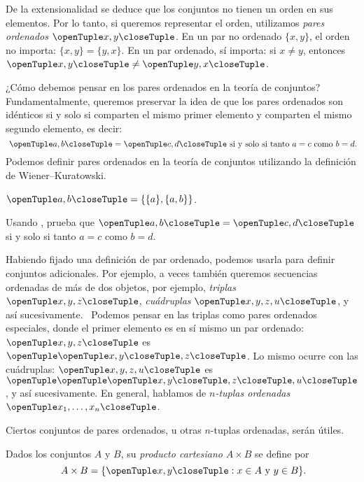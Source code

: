 \documentclass[../../../include/open-logic-section]{subfiles}
\begin{document}

\begin{explain}
De la extensionalidad se deduce que los conjuntos no tienen un orden en sus elementos. Por lo tanto, si queremos representar el orden, utilizamos \emph{pares ordenados} $\tuple{x, y}$. En un par no ordenado $\{x, y\}$, el orden no importa: $\{x, y\} = \{y, x\}$. En un par ordenado, sí importa: si $x \neq y$, entonces $\tuple{x, y} \neq \tuple{y, x}$.

¿Cómo debemos pensar en los pares ordenados en la teoría de conjuntos? Fundamentalmente, queremos preservar la idea de que los pares ordenados son idénticos si y solo si comparten el mismo primer elemento y comparten el mismo segundo elemento, es decir:
\[
  \tuple{a, b}= \tuple{c, d}\text{ si y solo si tanto }a = c \text{ como }b=d.
\]
Podemos definir pares ordenados en la teoría de conjuntos utilizando la definición de Wiener--Kuratowski.
\end{explain}

\begin{defn}
	$\tuple{a, b} = \{\{a\}, \{a, b\}\}$.
\end{defn}

\begin{prob}
	Usando , prueba que $\tuple{a, b}= \tuple{c, d}$ si y solo si tanto $a = c$ como $b=d$.
\end{prob}

\begin{explain}
Habiendo fijado una definición de par ordenado, podemos usarla para definir conjuntos adicionales. Por ejemplo, a veces también queremos secuencias ordenadas de más de dos objetos, por ejemplo, \emph{triplas} $\tuple{x, y, z}$, \emph{cuádruplas} $\tuple{x, y, z, u}$, y así sucesivamente.  Podemos pensar en las triplas como pares ordenados especiales, donde el primer elemento es en sí mismo un par ordenado: $\tuple{x, y, z}$ es $\tuple{\tuple{x, y},z}$. Lo mismo ocurre con las cuádruplas: $\tuple{x,y,z,u}$ es $\tuple{\tuple{\tuple{x,y},z},u}$, y así sucesivamente. En general, hablamos de \emph{$n$-tuplas ordenadas} $\tuple{x_1, \dots, x_n}$.

Ciertos conjuntos de pares ordenados, u otras $n$-tuplas ordenadas, serán útiles.
\end{explain}

\begin{defn}
Dados los conjuntos $A$ y $B$, su \emph{producto cartesiano} $A \times B$ se define por
\[
  A \times B = \Setabs{\tuple{x, y}}{x \in A \text{ y } y \in B}.
\]
\end{defn}
\end{document}
